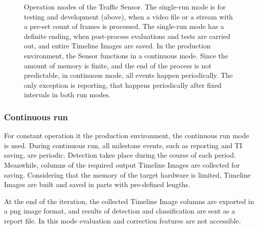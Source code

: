 \begin{figure}[!h]
	\centering
	
	\caption{Operation modes of the Traffic Sensor. The single-run mode is for testing and development (above), when a video file or a stream with a pre-set count of frames is processed. The single-run mode has a definite ending, when post-process evaluations and tests are carried out, and entire Timeline Images are saved. In the production environment, the Sensor functions in a continuous mode. Since the amount of memory is finite, and the end of the process is not predictable, in continuous mode, all events happen periodically. The only exception is reporting, that happens periodically after fixed intervals in both run modes. \label{fig:run_types}}
\end{figure}
\subsubsection{Continuous run}
For constant operation it the production environment, the continuous run mode is used.
During continuous run, all milestone events, such as reporting and TI saving, are periodic. 
Detection takes place during the course of each period. 
Meanwhile, columns of the required output Timeline Images are collected for saving.
Considering that the memory of the target hardware is limited, Timeline Images are built and saved in parts with pre-defined lengths.

At the end of the iteration, the collected Timeline Image columns are exported in a png image format, and results of detection and classification are sent as a report file.
In this mode evaluation and correction features are not accessible.

